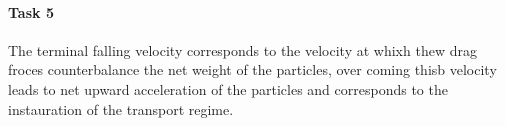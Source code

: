 \documentclass[letterpaper,10pt,english]{jupyterBook}
\begin{document}
\paragraph{Task 5}
\label{\detokenize{Exercise_W11_2021:task-5}}
\sphinxAtStartPar
The terminal falling velocity corresponds to the velocity at whixh thew drag froces counterbalance the net weight of the particles, over coming thisb velocity leads to net upward acceleration of the particles and corresponds to the instauration of the transport regime.







\renewcommand{\indexname}{Index}
\printindex
\end{document}
